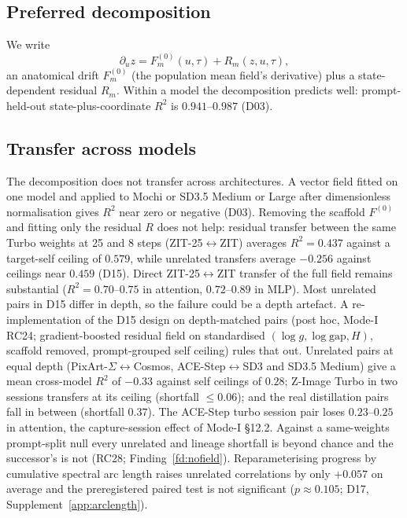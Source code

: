 \documentclass[11pt]{article}
\theoremstyle{definition}
\newcommand{\gap}{\mathrm{gap}}
\newcommand{\TT}{ZIT-25}%
\begin{document}
\subsection{Preferred decomposition}
We write
\begin{equation}\label{eq:decomp}
 \partial_u z = F^{(0)}_m(u,\tau) + R_m(z,u,\tau),
\end{equation}
an anatomical drift $F^{(0)}_m$ (the population mean field's derivative) plus a state-dependent residual $R_m$. Within a model the decomposition predicts well: prompt-held-out state-plus-coordinate $R^2$ is $0.941$--$0.987$ (D03).

\subsection{Transfer across models}
The decomposition does not transfer across architectures. A vector field fitted on one model and applied to Mochi or SD3.5 Medium or Large after dimensionless normalisation gives $R^2$ near zero or negative (D03). Removing the scaffold $F^{(0)}$ and fitting only the residual $R$ does not help: residual transfer between the same Turbo weights at 25 and 8 steps (\TT{}$\leftrightarrow$ZIT) averages $R^2=0.437$ against a target-self ceiling of $0.579$, while unrelated transfers average $-0.256$ against ceilings near $0.459$ (D15). Direct \TT{}$\leftrightarrow$ZIT transfer of the full field remains substantial ($R^2=0.70$--$0.75$ in attention, $0.72$--$0.89$ in MLP). Most unrelated pairs in D15 differ in depth, so the failure could be a depth artefact. A re-implementation of the D15 design on depth-matched pairs (post hoc, Mode-I RC24; gradient-boosted residual field on standardised $(\log g,\log\gap,H)$, scaffold removed, prompt-grouped self ceiling) rules that out. Unrelated pairs at equal depth (PixArt-$\Sigma$$\leftrightarrow$Cosmos, ACE-Step$\leftrightarrow$SD3 and SD3.5 Medium) give a mean cross-model $R^2$ of $-0.33$ against self ceilings of $0.28$; Z-Image Turbo in two sessions transfers at its ceiling (shortfall $\le0.06$); and the real distillation pairs fall in between (shortfall $0.37$). The ACE-Step turbo session pair loses $0.23$--$0.25$ in attention, the capture-session effect of Mode-I \S12.2. Against a same-weights prompt-split null every unrelated and lineage shortfall is beyond chance and the successor's is not (RC28; Finding~\ref{fd:nofield}). Reparameterising progress by cumulative spectral arc length raises unrelated correlations by only $+0.057$ on average and the preregistered paired test is not significant ($p\approx0.105$; D17, Supplement~\ref{app:arclength}).
\end{document}
